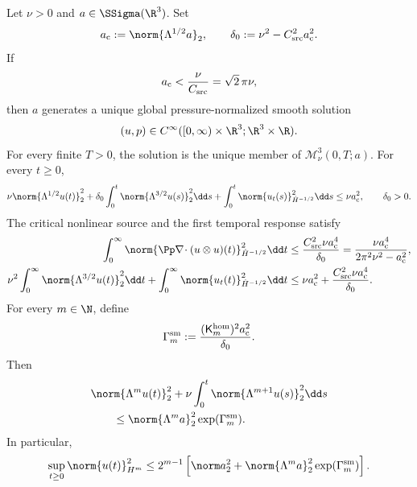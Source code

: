 \begin{theorem}
\label{thm:app-small-critical-global}
Let \(\nu>0\) and \(a\in\SSigma(\R^3)\).
Set
\[
 a_{\rm c}:=\norm{\Lambda^{1/2}a}_2,
 \qquad
 \delta_0:=\nu^2-C_{\rm src}^2a_{\rm c}^2.
\]
If
\begin{equation}
 a_{\rm c}<\frac{\nu}{C_{\rm src}}=\sqrt2\,\pi\nu,
 \label{eq:app-critical-smallness}
\end{equation}
then \(a\) generates a unique global pressure-normalized smooth solution
\[
 (u,p)\in C^\infty([0,\infty)\times\R^3;\R^3\times\R).
\]
For every finite \(T>0\), the solution is the unique member of
\(\mathscr M_\nu^3(0,T;a)\).
For every \(t\ge0\),
\begin{equation}
 \nu\norm{\Lambda^{1/2}u(t)}_2^2
 {}+\delta_0\int_0^t\norm{\Lambda^{3/2}u(s)}_2^2\dd s
+\int_0^t\norm{u_t(s)}_{\dot H^{-1/2}}^2\dd s
 \le\nu a_{\rm c}^2,
 \qquad \delta_0>0.
 \label{eq:app-critical-stock-action}
\end{equation}
The critical nonlinear source and the first temporal response satisfy
\begin{align}
 \int_0^\infty
 \norm{\Pp\nabla\!\cdot(u\otimes u)(t)}_{\dot H^{-1/2}}^2\dd t
 &\le \frac{C_{\rm src}^2\nu a_{\rm c}^4}{\delta_0}
 =\frac{\nu a_{\rm c}^4}{2\pi^2\nu^2-a_{\rm c}^2},
 \label{eq:app-small-critical-nonlinear-bound}\\
 \nu^2\int_0^\infty\norm{\Lambda^{3/2}u(t)}_2^2\dd t
 +\int_0^\infty\norm{u_t(t)}_{\dot H^{-1/2}}^2\dd t
 &\le \nu a_{\rm c}^2+\frac{C_{\rm src}^2\nu a_{\rm c}^4}{\delta_0}.
 \label{eq:app-small-first-temporal-response}
\end{align}
For every \(m\in\N\), define
\[
 \Gamma_m^{\rm sm}
 :=\frac{(\mathsf K_m^{\rm hom})^2a_{\rm c}^2}{\delta_0}.
\]
Then
\begin{align}
 &\norm{\Lambda^mu(t)}_2^2
 +\nu\int_0^t\norm{\Lambda^{m+1}u(s)}_2^2\dd s
 \notag\\
 &\qquad\le
 \norm{\Lambda^ma}_2^2\exp(\Gamma_m^{\rm sm}).
 \label{eq:app-small-data-finite-order}
\end{align}
In particular,
\begin{equation}
 \sup_{t\ge0}\norm{u(t)}_{H^m}^2
 \le
 2^{m-1}\left[
 \norm a_2^2+
 \norm{\Lambda^ma}_2^2\exp(\Gamma_m^{\rm sm})
 \right].
 \label{eq:app-small-data-Hm}
\end{equation}
\end{theorem}

